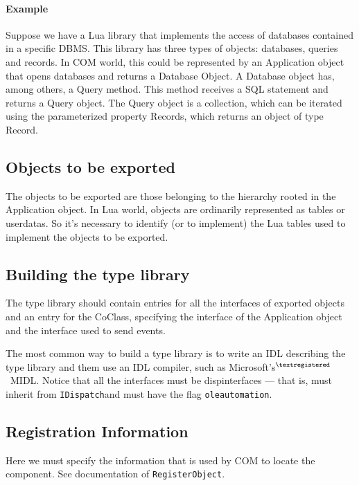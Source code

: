 \documentclass[11pt,a4paper,english]{report}
\newcommand{\ident}[1]{\mbox{\texttt{#1}}}
\newcommand{\idispatch}{\ident{IDispatch}}
\newcommand{\registered}{$^{\textregistered}$}
\begin{document}
\paragraph{Example} Suppose we have a Lua library that implements the
access of databases contained in a specific DBMS. This library has
three types of objects: databases, queries and records. In COM world,
this could be represented by an Application object that opens
databases and returns a Database Object. A Database object has, among
others, a Query method. This method receives a SQL statement and
returns a Query object. The Query object is a collection, which can be
iterated using the parameterized property Records, which returns an
object of type Record.


\subsection{Objects to be exported}

The objects to be exported are those belonging to the hierarchy rooted
in the Application object. In Lua world, objects are ordinarily
represented as tables or userdatas. So it's necessary to identify (or
to implement) the Lua tables used to implement the objects to be
exported.



\subsection{Building the type library}

The type library should contain entries for all the interfaces of
exported objects and an entry for the CoClass, specifying the
interface of the Application object and the interface used to send
events.

The most common way to build a type library is to write an IDL
describing the type library and them use an IDL compiler, such as
Microsoft's\registered\ MIDL. Notice that all the interfaces must be
dispinterfaces --- that is, must inherit from \idispatch and must have
the flag \texttt{oleautomation}.



\subsection{Registration Information}

Here we must specify the information that is used by COM to locate the
component. See documentation of \verb+RegisterObject+.
\end{document}
